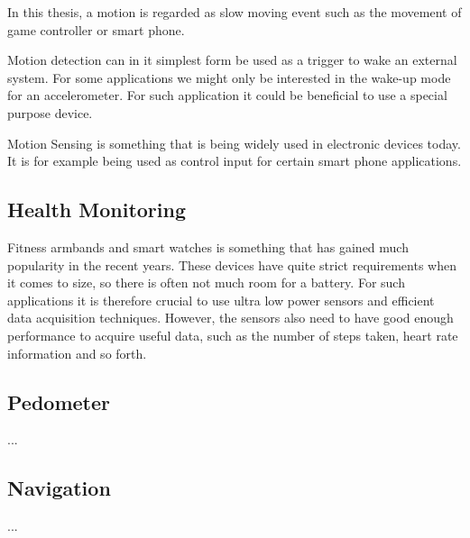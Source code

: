 In this thesis, a motion is regarded as slow moving event such as the movement of game controller or smart phone.

Motion detection can in it simplest form be used as a trigger to wake an external system. 
For some applications we might only be interested in the wake-up mode for an accelerometer. For such application it could be beneficial to use a special purpose device.

Motion Sensing is something that is being widely used in electronic devices today. It is for example being used as control input for certain smart phone applications.

\subsection{Health Monitoring}

Fitness armbands and smart watches is something that has gained much popularity in the recent years. These devices have quite strict requirements when it comes to size, so there is often not much room for a battery. For such applications it is therefore crucial to use ultra low power sensors and efficient data acquisition techniques. However, the sensors also need to have good enough performance to acquire useful data, such as the number of steps taken, heart rate information and so forth.  

\subsection{Pedometer}

...

\subsection{Navigation}

...
